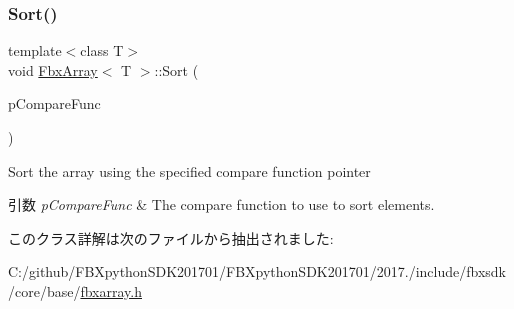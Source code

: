 \subsubsection{\texorpdfstring{Sort()}{Sort()}}
{\footnotesize\ttfamily template$<$class T$>$ \\
void \hyperlink{class_fbx_array}{Fbx\+Array}$<$ T $>$\+::Sort (\begin{DoxyParamCaption}\item[{\hyperlink{class_fbx_array_a3f251a5b7314e26facb298dcf3856557}{Compare\+Func}}]{p\+Compare\+Func }\end{DoxyParamCaption})}

Sort the array using the specified compare function pointer 
\begin{DoxyParams}{引数}
{\em p\+Compare\+Func} & The compare function to use to sort elements. \\
\hline
\end{DoxyParams}


このクラス詳解は次のファイルから抽出されました\+:\begin{DoxyCompactItemize}
\item 
C\+:/github/\+F\+B\+Xpython\+S\+D\+K201701/\+F\+B\+Xpython\+S\+D\+K201701/2017./include/fbxsdk/core/base/\hyperlink{fbxarray_8h}{fbxarray.\+h}\end{DoxyCompactItemize}

